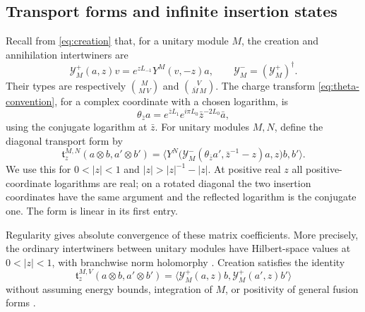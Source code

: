 \subsection{Transport forms and infinite insertion states}

Recall from \eqref{eq:creation} that, for a unitary module $M$, the creation and annihilation intertwiners are
\[
 \mathcal Y_M^+(a,z)v=e^{zL_{-1}}Y^M(v,-z)a,
 \qquad \mathcal Y_M^-=(\mathcal Y_M^+)^\dagger.
\]
Their types are respectively $\binom{M}{M\,V}$ and
$\binom{V}{\bar M\,M}$.  The charge transform \eqref{eq:theta-convention},
for a complex coordinate with a chosen logarithm, is
\[
 \theta_{\bar z}a
   =e^{\bar zL_1}e^{i\pi L_0}\bar z^{-2L_0}\bar a,
\]
using the conjugate logarithm at $\bar z$.
For unitary modules $M,N$, define the diagonal transport form by
\begin{equation}\label{eq:transport-form}
 \mathfrak t_z^{M,N}(a\otimes b,a'\otimes b')
 =\big\langle
 Y^N\big(\mathcal Y_M^-(\theta_{\bar z}a',
                         \bar z^{-1}-z)a,z\big)b,b'\big\rangle.
\end{equation}
We use this for $0<|z|<1$ and $|z|>|z|^{-1}-|z|$.
At positive real $z$ all positive-coordinate logarithms are real;
on a rotated diagonal the two insertion coordinates have the same
argument and the reflected logarithm is the conjugate one.  The form
is linear in its first entry.

Regularity gives absolute convergence of these matrix coefficients.
More precisely, the ordinary intertwiners between unitary modules have
Hilbert-space values at $0<|z|<1$, with branchwise norm holomorphy
\cite[Definition~2.8, Lemma~2.9 and Proposition~3.11]{TenerFusion}.
Creation satisfies the identity
\begin{equation}\label{eq:creation-transport}
 \mathfrak t_z^{M,V}(a\otimes b,a'\otimes b')
   =\langle\mathcal Y_M^+(a,z)b,
                  \mathcal Y_M^+(a',z)b'\rangle
\end{equation}
without assuming energy bounds, integration of $M$, or positivity of
general fusion forms \cite[Proposition~3.10]{TenerFusion}.

